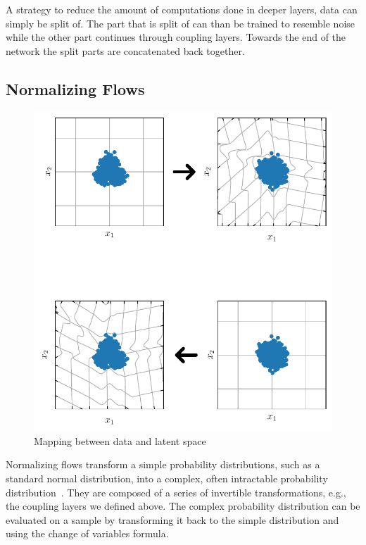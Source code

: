 A strategy to reduce the amount of computations done in deeper layers, data can
simply be split of. The part that is split of can than be trained to resemble
noise while the other part continues through coupling layers. Towards the end
of the network the split parts are concatenated back together.


\subsection{Normalizing Flows}%
\label{sub:normalizing_flows}

\begin{figure}[htpb]
    \centering
    \includegraphics{figures/toy_example/gaussian_mixture/grid_transformed.pdf}
    \caption{Mapping between data and latent space}%
    \label{fig:normalizing_flow_mapping}
\end{figure}

Normalizing flows transform a simple probability distributions, such as a
standard normal distribution, into a complex, often intractable probability
distribution~\citep{kobyzevNormalizingFlowsIntroduction2020}. They are composed
of a series of invertible transformations, e.g., the coupling layers we defined
above. The complex probability distribution can be evaluated on a sample by
transforming it back to the simple distribution and using the change of
variables formula.

